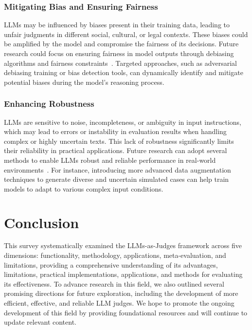 \subsubsection{Mitigating Bias and Ensuring Fairness}
LLMs may be influenced by biases present in their training data, leading to unfair judgments in different social, cultural, or legal contexts. These biases could be amplified by the model and compromise the fairness of its decisions. Future research could focus on ensuring fairness in model outputs through debiasing algorithms and fairness constraints~\cite{li2024calibraeval}. Targeted approaches, such as adversarial debiasing training or bias detection tools, can dynamically identify and mitigate potential biases during the model's reasoning process.

\subsubsection{Enhancing Robustness}
LLMs are sensitive to noise, incompleteness, or ambiguity in input instructions, which may lead to errors or instability in evaluation results when handling complex or highly uncertain texts. This lack of robustness significantly limits their reliability in practical applications.
Future research can adopt several methods to enable LLMs robust and reliable performance in real-world environments~\cite{shi2024optimization,elangovan2024beyond}. For instance, introducing more advanced data augmentation techniques to generate diverse and uncertain simulated cases can help train models to adapt to various complex input conditions.












\section{Conclusion}
\label{sec:Conclusion}
This survey systematically examined the LLMs-as-Judges framework across five dimensions: functionality, methodology, applications, meta-evaluation, and limitations, providing a comprehensive understanding of its advantages, limitations, practical implementations, applications, and methods for evaluating its effectiveness.
To advance research in this field, we also outlined several promising directions for future exploration, including the development of more efficient, effective, and reliable LLM judges. We hope to promote the ongoing development of this field by providing foundational resources and will continue to update relevant content.















